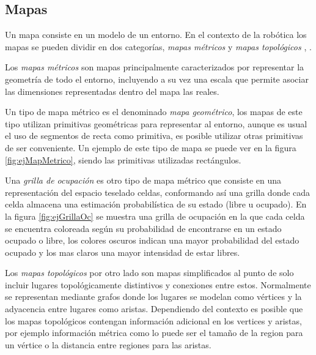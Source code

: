 
\subsection{Mapas}\label{subsec:mapas}
Un mapa consiste en un modelo de un entorno. En el contexto de la robótica los mapas se pueden dividir en dos categorías, \emph{mapas métricos} y \emph{mapas topológicos} \cite{Thrun1998}, \cite{choset2005principles}.

Los \emph{mapas métricos} son mapas principalmente caracterizados por representar la geometría de todo el entorno, incluyendo a su vez una escala que permite asociar las dimensiones representadas dentro del mapa las reales.

Un tipo de mapa métrico es el denominado \emph{mapa geométrico}, los mapas de este tipo utilizan primitivas geométricas para representar al entorno, aunque es usual el uso de segmentos de recta como primitiva, es posible utilizar otras primitivas de ser conveniente. Un ejemplo de este tipo de mapa se puede ver en la figura \ref{fig:ejMapMetrico}, siendo las primitivas utilizadas rectángulos.

Una \emph{grilla de ocupación} es otro tipo de mapa métrico que consiste en una representación del espacio teselado celdas, conformando así una grilla donde cada celda almacena una estimación probabilística de su estado (libre u ocupado). En la figura \ref{fig:ejGrillaOc} se muestra una grilla de ocupación en la que cada celda se encuentra coloreada según su probabilidad de encontrarse en un estado ocupado o libre, los colores oscuros indican una mayor probabilidad del estado ocupado y los mas claros una mayor intensidad de estar libres.

Los \emph{mapas topológicos} por otro lado son mapas simplificados al punto de solo incluir lugares topológicamente distintivos y conexiones entre estos. Normalmente se representan mediante  grafos donde los lugares se modelan como vértices y la adyacencia entre lugares como aristas. Dependiendo del contexto es posible que los mapas topológicos contengan información adicional en los vertices y aristas, por ejemplo información métrica como lo puede ser el tamaño de la region para un vértice o la distancia entre regiones para las aristas.

